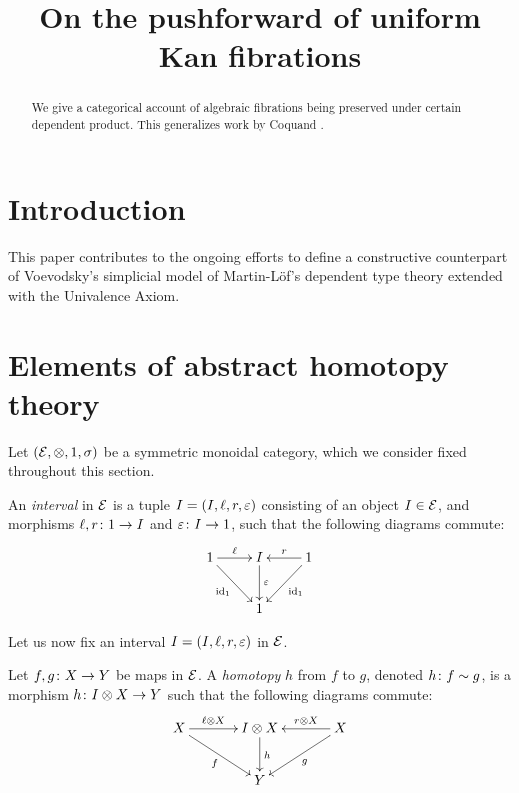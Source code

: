 \documentclass[reqno,10pt,a4paper,oneside]{amsart}
\title{On the pushforward of uniform Kan fibrations}
\begin{document}
\begin{abstract}
We give a categorical account of algebraic fibrations being preserved under certain dependent product.
This generalizes work by Coquand \etal.
\end{abstract}

\maketitle

\tableofcontents


\section{Introduction}

This paper contributes to the ongoing efforts to define a constructive counterpart of Voevodsky's 
simplicial model of Martin-L\"of's dependent type theory extended with the Univalence Axiom. 

\newpage


\section{Elements of abstract homotopy theory} 

Let $(\mathcal{E}, \otimes, 1, \sigma)$ be a symmetric monoidal category, which we consider fixed throughout this section. 



\begin{definition} An \emph{interval} in $\mathcal{E}$ is a tuple $I = (I, \ell, r, \varepsilon)$ consisting of  an object $I \in \mathcal{E}$, 
and morphisms $\ell, r \colon 1 \to I$ and $\varepsilon \colon I \to 1$,   such that the following diagrams commute:
\[
\xymatrix{
\unit \ar[r]^\intervall \ar[dr]_{\id_\unit} & \interval \ar[d]^-{\varepsilon} & \unit \ar[dl]^{\id_\unit} \ar[l]_{\intervalr}  \\
 & \unit & }
 \]
\end{definition}

Let us now fix an interval $I = (I,  \ell, r, \varepsilon)$ in $\mathcal{E}$. 


\begin{definition}
\label{def:homotopy}
Let $f, g \colon X \to Y$ be maps in $\mathcal{E}$. A \emph{homotopy} $h$ from $f$ to $g$, denoted $h \colon f \sim g$, is a morphism $h \colon I \otimes X \to Y$ such that the following diagrams commute:
\[
\xymatrix@C=1.2cm{
X \ar[r]^-{\intervall \otimes X} \ar[dr]_{f} & \interval \otimes X \ar[d]^{h} & X \ar[dl]^{g} \ar[l]_-{\intervalr \otimes X}  \\
 & Y & }
 \]
\end{definition}
\end{document}
